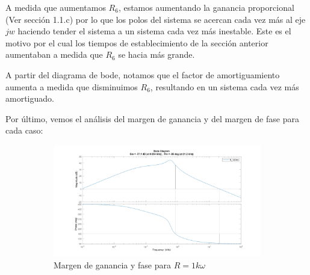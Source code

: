 \documentclass[e4_tp2_main.tex]{subfiles}
\begin{document}
  
A medida que aumentamos $R_6$, estamos aumentando la ganancia proporcional (Ver secci\'on 1.1.c) por lo que los polos del sistema se acercan cada vez m\'as al eje $jw$ haciendo tender el sistema a un sistema cada vez m\'as inestable. Este es el motivo por el cual los tiempos de establecimiento de la secci\'on anterior aumentaban a medida que $R_6$ se hacia m\'as grande. 

A partir del diagrama de bode, notamos que el factor de amortiguamiento aumenta a medida que disminuimos $R_6$, resultando en un sistema cada vez m\'as amortiguado.

Por último, vemos el análisis del margen de ganancia y del margen de fase para cada caso:
\begin{figure}[H]
  \begin{subfigure}[b]{0.5\textwidth}
    \includegraphics[width=\textwidth, height=\textwidth]{Imagenes/Punto1/gain_r1k.png}
    \caption{ Margen de ganancia y fase para $R=1 k\omega $}
    \label{fig:f12}
  \end{subfigure}
  \hfill
  \begin{subfigure}[b]{0.5\textwidth}

\end{subfigure}
\end{figure}
\end{document}
